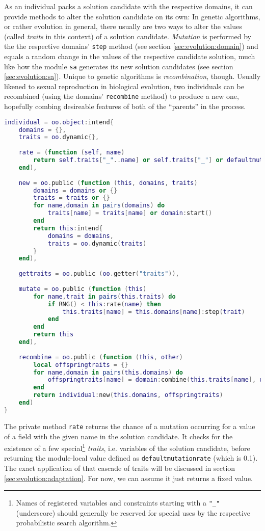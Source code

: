 As an individual packs a solution candidate with the respective domains, it can provide methods to alter the solution candidate on its own: In genetic algorithms, or rather evolution in general, there usually are two ways to alter the values (called \emph{traits} in this context) of a solution candidate. \emph{Mutation} is performed by the the respective domains' \texttt{step} method (see section \ref{sec:evolution:domain}) and equals a random change in the values of the respective candidate solution, much like how the module \texttt{sa} generates its new solution candidates (see section \ref{sec:evolution:sa}). Unique to genetic algorithms is \emph{recombination}, though. Usually likened to sexual reproduction in biological evolution, two individuals can be recombined (using the domains' \texttt{recombine} method) to produce a new one, hopefully combing desireable features of both of the ``parents'' in the process.

\begin{lstlisting}[language=lua, caption={Definition of the object \texttt{evolution.individual}}, label=lst:individual, name=lst:individual]
individual = oo.object:intend{
	domains = {},
	traits = oo.dynamic{},
	
	rate = (function (self, name)
		return self.traits["_"..name] or self.traits["_"] or defaultmutationrate
	end),
	
	new = oo.public (function (this, domains, traits)
		domains = domains or {}
		traits = traits or {}
		for name,domain in pairs(domains) do
			traits[name] = traits[name] or domain:start()
		end
		return this:intend{
			domains = domains,
			traits = oo.dynamic(traits)
		}
	end),
	
	gettraits = oo.public (oo.getter("traits")),
	
	mutate = oo.public (function (this)
		for name,trait in pairs(this.traits) do
			if RNG() < this:rate(name) then
				this.traits[name] = this.domains[name]:step(trait)
			end
		end
		return this
	end),
	
	recombine = oo.public (function (this, other)
		local offspringtraits = {}
		for name,domain in pairs(this.domains) do
			offspringtraits[name] = domain:combine(this.traits[name], other:gettraits()[name])
		end
		return individual:new(this.domains, offspringtraits)
	end)
}
\end{lstlisting}

The private method \texttt{rate} returns the chance of a mutation occurring for a value of a field with the given name in the solution candidate. It checks for the existence of a few special\footnote{Names of registered variables and constraints starting with a \texttt{"\_"} (underscore) should generally be reserved for special uses by the respective probabilistic search algorithm.} \emph{traits}, i.e. variables of the solution candidate, before returning the module-local value defined as \texttt{defaultmutationrate} (which is 0.1). The exact application of that cascade of traits will be discussed in section \ref{sec:evolution:adaptation}. For now, we can assume it just returns a fixed value.

